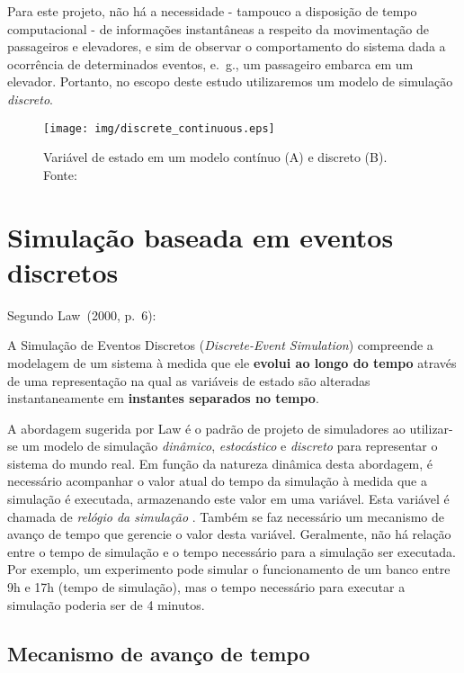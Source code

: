 \begin{enumerate}
Para este projeto, não há a necessidade - tampouco a disposição de tempo
computacional - de informações instantâneas a respeito da movimentação de
passageiros e elevadores, e sim de observar o comportamento do sistema dada a
ocorrência de determinados eventos, e.~g., um passageiro embarca em um elevador.
Portanto, no escopo deste estudo utilizaremos um modelo de simulação
\textit{discreto}.

\begin{figure}[htb!]
\centering\texttt{[image: img/discrete\_continuous.eps]}
\caption[Variável de estado em um modelo contínuo e discreto]{\label{fig:disccont}Variável de estado em um modelo contínuo (A) e discreto (B). Fonte:~\cite{Banks}}
\end{figure}

\end{enumerate}

\section{Simulação baseada em eventos discretos}

Segundo Law~(2000, p.~6):

\begin{directcite}
A Simulação de Eventos Discretos (\textit{Discrete-Event Simulation}) compreende
a modelagem de um sistema à medida que ele \textbf{evolui ao longo do tempo}
através de uma representação na qual as variáveis de estado são alteradas
instantaneamente em \textbf{instantes separados no tempo}.
\end{directcite}

A abordagem sugerida por Law é o padrão de projeto de simuladores ao utilizar-se
um modelo de simulação \textit{dinâmico}, \textit{estocástico} e
\textit{discreto} para representar o sistema do mundo real. Em função da
natureza dinâmica desta abordagem, é necessário acompanhar o valor atual do
tempo da simulação à medida que a simulação é executada, armazenando este valor
em uma variável. Esta variável é chamada de \textit{relógio da simulação}
\cite{Law}. Também se faz necessário um mecanismo de avanço de tempo que
gerencie o valor desta variável. Geralmente, não há relação entre o tempo de
simulação e o tempo necessário para a simulação ser executada. Por exemplo, um
experimento pode simular o funcionamento de um banco entre 9h e 17h (tempo de
simulação), mas o tempo necessário para executar a simulação poderia ser de 4
minutos.

\subsection{\label{chap:sim:timeadvance}Mecanismo de avanço de tempo}


